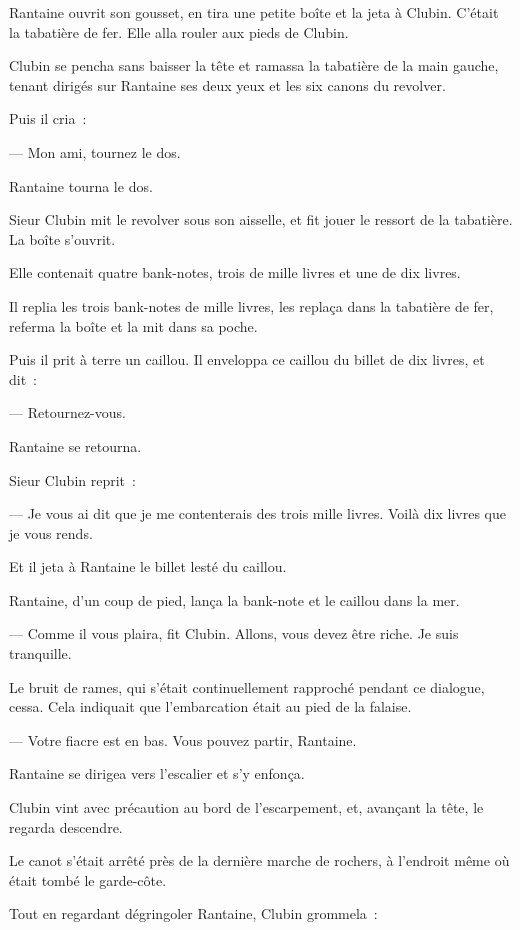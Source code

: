 \documentclass[french,twoside]{book} %
\begin{document}
Rantaine ouvrit son gousset, en tira une petite boîte et la jeta à Clubin. C’était la tabatière de fer. Elle alla rouler aux pieds de Clubin.\par
Clubin se pencha sans baisser la tête et ramassa la  tabatière de la main gauche, tenant dirigés sur Rantaine ses deux yeux et les six canons du revolver.\par
Puis il cria :\par
— Mon ami, tournez le dos.\par
Rantaine tourna le dos.\par
Sieur Clubin mit le revolver sous son aisselle, et fit jouer le ressort de la tabatière. La boîte s’ouvrit.\par
Elle contenait quatre bank-notes, trois de mille livres et une de dix livres.\par
Il replia les trois bank-notes de mille livres, les replaça dans la tabatière de fer, referma la boîte et la mit dans sa poche.\par
Puis il prit à terre un caillou. Il enveloppa ce caillou du billet de dix livres, et dit :\par
— Retournez-vous.\par
Rantaine se retourna.\par
Sieur Clubin reprit :\par
— Je vous ai dit que je me contenterais des trois mille livres. Voilà dix livres que je vous rends.\par
Et il jeta à Rantaine le billet lesté du caillou.\par
Rantaine, d’un coup de pied, lança la bank-note et le caillou dans la mer.\par
— Comme il vous plaira, fit Clubin. Allons, vous devez être riche. Je suis tranquille.\par
Le bruit de rames, qui s’était continuellement rapproché pendant ce dialogue, cessa. Cela indiquait que l’embarcation était au pied de la falaise.\par
— Votre fiacre est en bas. Vous pouvez partir, Rantaine.\par
Rantaine se dirigea vers l’escalier et s’y enfonça.\par
 Clubin vint avec précaution au bord de l’escarpement, et, avançant la tête, le regarda descendre.\par
Le canot s’était arrêté près de la dernière marche de rochers, à l’endroit même où était tombé le garde-côte.\par
Tout en regardant dégringoler Rantaine, Clubin grommela :\par
\end{document}
